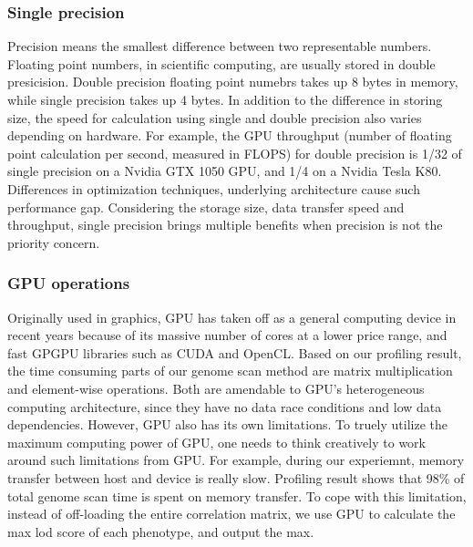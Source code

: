 \documentclass[9pt,twocolumn,twoside,lineno]{gsag3jnl}
\begin{document}
 
\subsubsection{Single precision}
Precision means the smallest difference between two representable numbers.
Floating point numbers, in scientific computing, are usually stored in double presicision. 
Double precision floating point numebrs takes up 8 bytes in memory, while single precision takes up 4 bytes. 
In addition to the difference in storing size, the speed for calculation using single and double precision also varies depending on hardware. 
For example, the GPU throughput (number of floating point calculation per second, measured in FLOPS) for double precision is 1/32 of single precision on a Nvidia GTX 1050 GPU, and 1/4 on a Nvidia Tesla K80. 
Differences in optimization techniques, underlying architecture cause such performance gap. 
Considering the storage size, data transfer speed and throughput, single precision brings multiple benefits when precision is not the priority concern. 


\subsubsection{GPU operations}

Originally used in graphics, GPU has taken off as a general computing device in recent years because of its massive number of cores at a lower price range, and fast GPGPU libraries such as CUDA and OpenCL.
Based on our profiling result, the time consuming parts of our genome scan method are matrix multiplication and element-wise operations. 
Both are amendable to GPU's heterogeneous computing architecture, since they have no data race conditions and low data dependencies. 
However, GPU also has its own limitations. 
To truely utilize the maximum computing power of GPU, one needs to think creatively to work around such limitations from GPU. 
For example, during our experiemnt, memory transfer between host and device is really slow. 
Profiling result shows that 98\% of total genome scan time is spent on memory transfer. 
To cope with this limitation, instead of off-loading the entire correlation matrix, we use GPU to calculate the max lod score of each phenotype, and output the max. 
\end{document}
